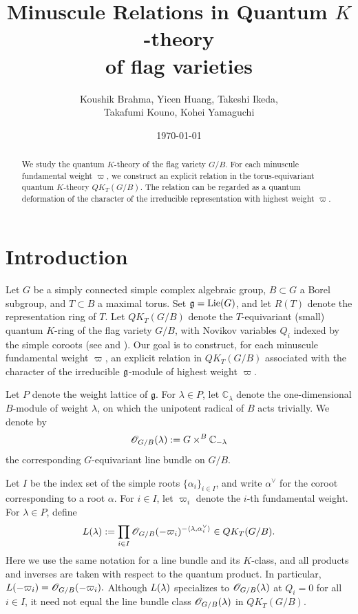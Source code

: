 \documentclass{amsart}
\title[Relations in Quantum \(K\)-Theory of Flag Varieties]{
Minuscule Relations in Quantum \(K\)-theory \\
 of
 flag varieties
}
\author[K.~Brahma, Y.~Huang, T.~Ikeda, T.~Kouno, K.~Yamaguchi]{Koushik Brahma, Yicen Huang, Takeshi Ikeda, \\ Takafumi Kouno, Kohei Yamaguchi}
\date{\today}
\numberwithin{equation}{section}
\begin{document}


\begin{abstract}
We study the quantum \(K\)-theory of the flag variety \(G/B\). For each
minuscule fundamental weight \(\varpi\), we construct an explicit relation
in the torus-equivariant quantum \(K\)-theory \(QK_T(G/B)\). The relation
can be regarded as a quantum deformation of the character of the
irreducible representation with highest weight \(\varpi\).
\end{abstract}
\maketitle





\section{Introduction}
Let $G$ be a simply connected simple complex algebraic group,
$B\subset G$ a Borel subgroup, and $T\subset B$ a maximal torus.
Set $\mathfrak{g}=\operatorname{Lie}(G)$, and let \(R(T)\) denote the
representation ring of \(T\). Let $QK_T(G/B)$ denote the
$T$-equivariant (small) quantum $K$-ring of the flag variety $G/B$, with Novikov variables $Q_i$
indexed by the simple coroots (see \cite{Givental} and \cite{Lee}).
Our goal is to construct, for each minuscule fundamental weight
$\varpi$, an explicit relation in $QK_T(G/B)$ associated with the
character of the irreducible $\mathfrak{g}$-module of highest weight $\varpi$.



Let $P$ denote the weight lattice of $\mathfrak g$. For $\lambda\in P$, let
\(\mathbb C_\lambda\) denote the one-dimensional \(B\)-module of weight
\(\lambda\), on which the unipotent radical of \(B\) acts trivially. 
We
denote by
\[
\mathscr{O}_{G/B}(\lambda):=G\times^B \mathbb C_{-\lambda}
\]
the corresponding \(G\)-equivariant line bundle on \(G/B\).



Let \(I\) be the index set of the simple roots
\(\{\alpha_i\}_{i\in I}\), and
write $\alpha^\lor$ for the coroot corresponding to a root $\alpha.$ 
For \(i\in I\), let \(\varpi_i\) denote the \(i\)-th fundamental weight.
For \(\lambda\in P\), define
\begin{equation*}
    {L}(\lambda)
    :=
    \prod_{i\in I}
    \mathscr{O}_{G/B}(-\varpi_i)^{-\langle \lambda,\alpha_i^\lor\rangle}
    \in QK_T(G/B).
\end{equation*}
Here we use the same notation for a line bundle and its \(K\)-class,
and all products and inverses are taken with respect to the quantum product.
In particular, $L(-\varpi_i)=\mathscr{O}_{G/B}(-\varpi_i).$
Although \({L}(\lambda)\) specializes to \(\mathscr{O}_{G/B}(\lambda)\)
at \(Q_i=0\) for all \(i\in I\), it need not equal the line bundle
class \(\mathscr{O}_{G/B}(\lambda)\) in \(QK_T(G/B)\).
\end{document}
